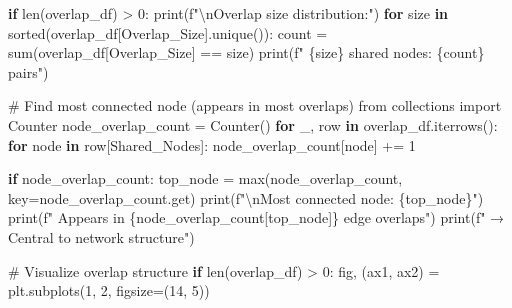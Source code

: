 \documentclass[
  11pt,
  letterpaper,
  oneside,
  openany]{book}
\newenvironment{Shaded}{\begin{snugshade}}{\end{snugshade}}
\newcommand{\BuiltInTok}[1]{\textcolor[rgb]{0.00,0.23,0.31}{#1}}
\newcommand{\CharTok}[1]{\textcolor[rgb]{0.13,0.47,0.30}{#1}}
\newcommand{\CommentTok}[1]{\textcolor[rgb]{0.37,0.37,0.37}{#1}}
\newcommand{\ControlFlowTok}[1]{\textcolor[rgb]{0.00,0.23,0.31}{\textbf{#1}}}
\newcommand{\DecValTok}[1]{\textcolor[rgb]{0.68,0.00,0.00}{#1}}
\newcommand{\ImportTok}[1]{\textcolor[rgb]{0.00,0.46,0.62}{#1}}
\newcommand{\KeywordTok}[1]{\textcolor[rgb]{0.00,0.23,0.31}{\textbf{#1}}}
\newcommand{\NormalTok}[1]{\textcolor[rgb]{0.00,0.23,0.31}{#1}}
\newcommand{\OperatorTok}[1]{\textcolor[rgb]{0.37,0.37,0.37}{#1}}
\newcommand{\SpecialCharTok}[1]{\textcolor[rgb]{0.37,0.37,0.37}{#1}}
\newcommand{\SpecialStringTok}[1]{\textcolor[rgb]{0.13,0.47,0.30}{#1}}
\newcommand{\StringTok}[1]{\textcolor[rgb]{0.13,0.47,0.30}{#1}}
\begin{document}
\begin{Shaded}
\begin{Highlighting}[]
\ControlFlowTok{if} \BuiltInTok{len}\NormalTok{(overlap\_df) }\OperatorTok{\textgreater{}} \DecValTok{0}\NormalTok{:}
    \BuiltInTok{print}\NormalTok{(}\SpecialStringTok{f"}\CharTok{\textbackslash{}n}\SpecialStringTok{Overlap size distribution:"}\NormalTok{)}
    \ControlFlowTok{for}\NormalTok{ size }\KeywordTok{in} \BuiltInTok{sorted}\NormalTok{(overlap\_df[}\StringTok{\textquotesingle{}Overlap\_Size\textquotesingle{}}\NormalTok{].unique()):}
\NormalTok{        count }\OperatorTok{=} \BuiltInTok{sum}\NormalTok{(overlap\_df[}\StringTok{\textquotesingle{}Overlap\_Size\textquotesingle{}}\NormalTok{] }\OperatorTok{==}\NormalTok{ size)}
        \BuiltInTok{print}\NormalTok{(}\SpecialStringTok{f"  }\SpecialCharTok{\{}\NormalTok{size}\SpecialCharTok{\}}\SpecialStringTok{ shared nodes: }\SpecialCharTok{\{}\NormalTok{count}\SpecialCharTok{\}}\SpecialStringTok{ pairs"}\NormalTok{)}
    
    \CommentTok{\# Find most connected node (appears in most overlaps)}
    \ImportTok{from}\NormalTok{ collections }\ImportTok{import}\NormalTok{ Counter}
\NormalTok{    node\_overlap\_count }\OperatorTok{=}\NormalTok{ Counter()}
    \ControlFlowTok{for}\NormalTok{ \_, row }\KeywordTok{in}\NormalTok{ overlap\_df.iterrows():}
        \ControlFlowTok{for}\NormalTok{ node }\KeywordTok{in}\NormalTok{ row[}\StringTok{\textquotesingle{}Shared\_Nodes\textquotesingle{}}\NormalTok{]:}
\NormalTok{            node\_overlap\_count[node] }\OperatorTok{+=} \DecValTok{1}
    
    \ControlFlowTok{if}\NormalTok{ node\_overlap\_count:}
\NormalTok{        top\_node }\OperatorTok{=} \BuiltInTok{max}\NormalTok{(node\_overlap\_count, key}\OperatorTok{=}\NormalTok{node\_overlap\_count.get)}
        \BuiltInTok{print}\NormalTok{(}\SpecialStringTok{f"}\CharTok{\textbackslash{}n}\SpecialStringTok{Most connected node: }\SpecialCharTok{\{}\NormalTok{top\_node}\SpecialCharTok{\}}\SpecialStringTok{"}\NormalTok{)}
        \BuiltInTok{print}\NormalTok{(}\SpecialStringTok{f"  Appears in }\SpecialCharTok{\{}\NormalTok{node\_overlap\_count[top\_node]}\SpecialCharTok{\}}\SpecialStringTok{ edge overlaps"}\NormalTok{)}
        \BuiltInTok{print}\NormalTok{(}\SpecialStringTok{f"  → Central to network structure"}\NormalTok{)}

\CommentTok{\# Visualize overlap structure}
\ControlFlowTok{if} \BuiltInTok{len}\NormalTok{(overlap\_df) }\OperatorTok{\textgreater{}} \DecValTok{0}\NormalTok{:}
\NormalTok{    fig, (ax1, ax2) }\OperatorTok{=}\NormalTok{ plt.subplots(}\DecValTok{1}\NormalTok{, }\DecValTok{2}\NormalTok{, figsize}\OperatorTok{=}\NormalTok{(}\DecValTok{14}\NormalTok{, }\DecValTok{5}\NormalTok{))}
    

\end{Highlighting}
\end{Shaded}
\end{document}
